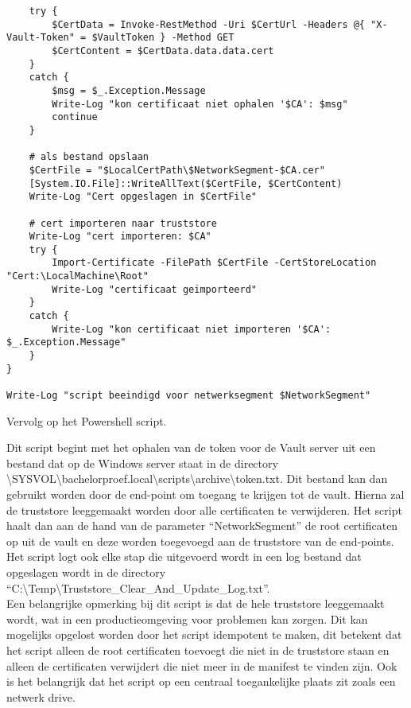 \begin{listing}[H]\ContinuedFloat
\begin{verbatim}
    try {
        $CertData = Invoke-RestMethod -Uri $CertUrl -Headers @{ "X-Vault-Token" = $VaultToken } -Method GET
        $CertContent = $CertData.data.data.cert  
    }
    catch {
        $msg = $_.Exception.Message
        Write-Log "kon certificaat niet ophalen '$CA': $msg"
        continue
    }

    # als bestand opslaan
    $CertFile = "$LocalCertPath\$NetworkSegment-$CA.cer"
    [System.IO.File]::WriteAllText($CertFile, $CertContent)
    Write-Log "Cert opgeslagen in $CertFile"

    # cert importeren naar truststore
    Write-Log "cert importeren: $CA"
    try {
        Import-Certificate -FilePath $CertFile -CertStoreLocation "Cert:\LocalMachine\Root"
        Write-Log "certificaat geimporteerd"
    }
    catch {
        Write-Log "kon certificaat niet importeren '$CA': $_.Exception.Message"
    }
}

Write-Log "script beeindigd voor netwerksegment $NetworkSegment"

\end{verbatim}
\caption[]{Vervolg op het Powershell script.}
\end{listing}

Dit script begint met het ophalen van de token voor de Vault server uit een bestand dat op de Windows server staat in de directory \\
\backslash SYSVOL\textbackslash bachelorproef.local\textbackslash scripts\textbackslash archive\textbackslash token.txt.
Dit bestand kan dan gebruikt worden door de end-point om toegang te krijgen tot de vault.
Hierna zal de truststore leeggemaakt worden door alle certificaten te verwijderen. Het script haalt dan aan de hand van de parameter ``NetworkSegment'' de root certificaten op uit de vault en deze worden toegevoegd aan de truststore van de end-points. \\

Het script logt ook elke stap die uitgevoerd wordt in een log bestand dat opgeslagen wordt in de directory ``C:\textbackslash Temp\textbackslash Truststore\_Clear\_And\_Update\_Log.txt''. \\

Een belangrijke opmerking bij dit script is dat de hele truststore leeggemaakt wordt, wat in een productieomgeving voor problemen kan zorgen. Dit kan mogelijks opgelost worden door het script idempotent te maken, dit betekent dat het script alleen de root certificaten toevoegt die niet in de truststore staan en alleen de certificaten verwijdert die niet meer in de manifest te vinden zijn. 
Ook is het belangrijk dat het script op een centraal toegankelijke plaats zit zoals een netwerk drive. \\

